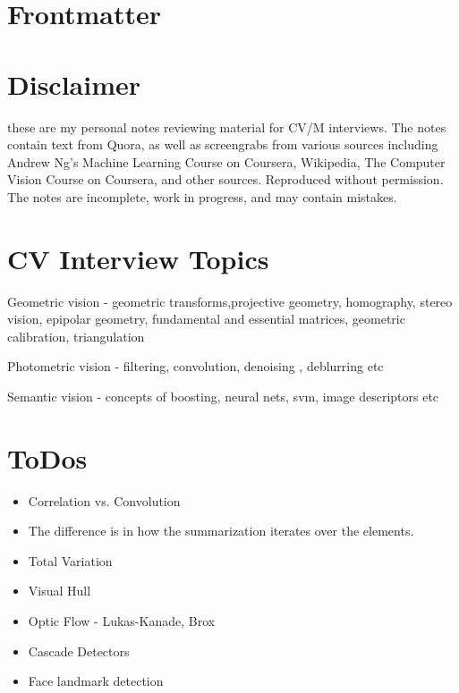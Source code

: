 \section{Frontmatter}
\label{chap:frontmatter}

\section{Disclaimer}

these are my personal notes reviewing material for CV/M interviews. The notes contain text from Quora, as well as screengrabs from various sources including Andrew Ng's Machine Learning Course on Coursera, Wikipedia, The Computer Vision Course on Coursera, and other sources. Reproduced without permission. The notes are incomplete, work in progress, and may contain mistakes.

\section{CV Interview Topics}

Geometric vision - geometric transforms,projective geometry, homography, stereo vision, epipolar geometry, fundamental and essential matrices, geometric calibration, triangulation

Photometric vision - filtering, convolution, denoising , deblurring etc

Semantic vision - concepts of boosting, neural nets, svm,  image descriptors etc

\section{ToDos}

\begin{itemize}
\item Correlation vs. Convolution
\item The difference is in how the summarization iterates over the elements.
\item Total Variation
\item Visual Hull
\item Optic Flow - Lukas-Kanade, Brox
\item Cascade Detectors
\item Face landmark detection
\end{itemize}